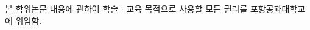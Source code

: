 \documentclass[master,english,final]{postech-ucs}
\begin{document}


    \vspace*{\fill}
    \noindent
    본 학위논문 내용에 관하여 학술 $\cdot$ 교육 목적으로 사용할 모든 권리를 포항공과대학교에 위임함.

    \afterpage{\blankpage}      %
\end{document}
